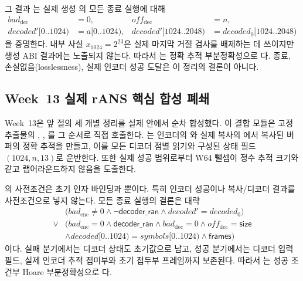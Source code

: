 그 결과
는 실제 생성
의 모든 종료 실행에 대해
\[
\begin{aligned}
  bad_{\mathrm{dec}}&=0,&
  off_{\mathrm{dec}}&=n,\\
  decoded'[0..1024)&=a[0..1024),&
  decoded'[1024..2048)&=decoded_0[1024..2048)
\end{aligned}
\]
을 증명한다. 내부 사실 \(x_{1024}=2^{23}\)은 실제 마지막 거절 검사를
배제하는 데 쓰이지만 생성 ABI 결과에는 노출되지 않는다. 따라서
는 정확 추적 부분정확성으로
\statusproved 다. 종료, 손실없음(losslessness), 실제 인코더 성공 도달은 이
정리의 결론이 아니다.

\subsection{Week~13 실제 rANS 핵심 합성 폐쇄}

Week~13은 앞 절의 세 개별 정리를 실제
 안에서 순차 합성했다. 이 결합 모듈은
고정 추출물의 ,
, 를 그 순서로
직접 호출한다. 는 인코더의
와 실제 복사의 에서 복사된
버퍼의 정확 추적을 만들고, 이를 모든 디코더 점별 읽기와 구성된 상태 필드
\((1024,n,13)\)로 운반한다. 또한 실제 성공 범위로부터 W64 뺄셈이 정수
추적 크기와 같고 랩어라운드하지 않음을 도출한다.

의 사전조건은 초기 인자
바인딩과 뿐이다. 특히 인코더 성공이나
복사/디코더 결과를 사전조건으로 넣지 않는다. 모든 종료 실행의 결론은 대략
\[
\begin{aligned}
  &\bigl(bad_{\mathrm{enc}}\ne0
    \land\neg\mathsf{decoder\_ran}
    \land decoded'=decoded_0\bigr)\\
  {}\lor{}&\bigl(bad_{\mathrm{enc}}=0
    \land\mathsf{decoder\_ran}
    \land bad_{\mathrm{dec}}=0
    \land off_{\mathrm{dec}}=\mathsf{size}\\
    &\land decoded[0..1024)=symbols[0..1024)
    \land\mathsf{frames}\bigr)
\end{aligned}
\]
이다. 실패 분기에서는 디코더 상태도 초기값으로 남고, 성공 분기에서는
디코더 입력 필드, 실제 인코더 추적 접미부와 초기 접두부 프레임까지 보존된다.
따라서 는 성공 조건부 Hoare 부분정확성으로
\statusproved 다.

